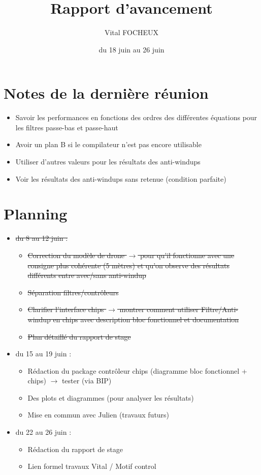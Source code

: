 \documentclass{article}
\title{Rapport d'avancement}
\author{Vital FOCHEUX}
\date{du 18 juin au 26 juin}
\begin{document}
\maketitle

\section{Notes de la dernière réunion}

\begin{itemize}
    \item Savoir les performances en fonctions des ordres des différentes équations pour les filtres passe-bas et passe-haut
    \item Avoir un plan B si le compilateur n'est pas encore utilisable
    \item Utiliser d'autres valeurs pour les résultats des anti-windups
    \item Voir les résultats des anti-windups sans retenue (condition parfaite)
\end{itemize}

\section{Planning}

\begin{itemize}
    \item \sout{du 8 au 12 juin :} 
    \begin{itemize}
        \item \sout{Correction du modèle de drone $\rightarrow$ pour qu'il fonctionne avec une consigne plus cohérente (5 mètres) et qu'on observe des résultats différents entre avec/sans anti-windup}
        \item \sout{Séparation filtres/contrôleurs}
        \item \sout{Clarifier l'interface chips $\rightarrow$ montrer comment utiliser Filtre/Anti-windup en chips avec description bloc fonctionnel et documentation}
        \item \sout{Plan détaillé du rapport de stage}
    \end{itemize}
    \item du 15 au 19 juin :
    \begin{itemize}
        \item Rédaction du package contrôleur chips (diagramme bloc fonctionnel + chips) $\rightarrow$ tester (via BIP)
        \item Des plots et diagrammes (pour analyser les résultats)
        \item Mise en commun avec Julien (travaux futurs)
    \end{itemize}
    \item du 22 au 26 juin :
    \begin{itemize}
        \item Rédaction du rapport de stage
        \item Lien formel travaux Vital / Motif control
    \end{itemize}
\end{itemize}
\end{document}
